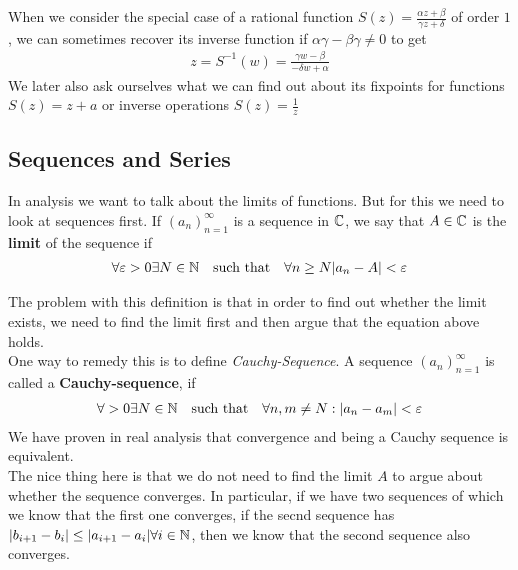 When we consider the special case of a rational function $S(z) = \frac{\alpha z + \beta}{\gamma z + \delta}$ of order $1$, we can sometimes recover its inverse function if $\alpha \gamma - \beta \gamma \neq 0$ to get
\begin{align*}
	z = S^{-1}(w) = \frac{\gamma w - \beta}{-\delta w + \alpha}
\end{align*}
We later also ask ourselves what we can find out about its fixpoints for functions $S(z) = z + a$ or inverse operations $S(z) = \frac{1}{z}$\\

\subsection{Sequences and Series}
In analysis we want to talk about the limits of functions. But for this we need to look at sequences first. If $\left(a_{n}\right)_{n = 1}^{\infty}$ is a sequence in $\mathbb{C}$, we say that $A \in \mathbb{C}$ is the \textbf{limit} of the sequence if
\begin{align*}
\forall \varepsilon > 0 \exists N \in \mathbb{N} \quad \text{such that} \quad \forall n \geq N \vert a_n - A\vert < \varepsilon
\end{align*}

The problem with this definition is that in order to find out whether the limit exists, we need to find the limit first and then argue that the equation above holds.\\
One way to remedy this is to define \emph{Cauchy-Sequence}. A sequence $\left(a_{n}\right)_{n = 1}^{\infty}$ is called a \textbf{Cauchy-sequence}, if
\begin{align*}
\forall > 0 \exists N \in \mathbb{N} \quad \text{such that} \quad \forall n,m \neq N: \vert a_n - a_m\vert < \varepsilon
\end{align*}
We have proven in real analysis that convergence and being a Cauchy sequence is equivalent.\\
The nice thing here is that we do not need to find the limit $A$ to argue about whether the sequence converges. In particular, if we have two sequences of which we know that the first one converges, if the secnd sequence has $\vert b_{i+1} - b_i\vert \leq \vert a_{i+1} - a_i\vert \forall i \in \mathbb{N}$, then we know that the second sequence also converges.\\

